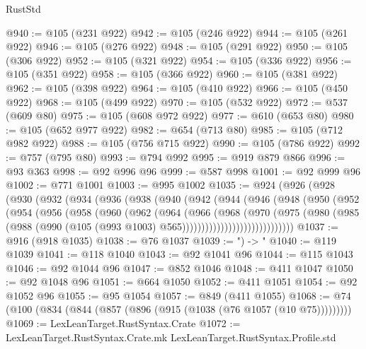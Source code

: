 \begin{lexlean}{RustStd}
\begin{coremodule}
@940 := @105 (@231 @922)
@942 := @105 (@246 @922)
@944 := @105 (@261 @922)
@946 := @105 (@276 @922)
@948 := @105 (@291 @922)
@950 := @105 (@306 @922)
@952 := @105 (@321 @922)
@954 := @105 (@336 @922)
@956 := @105 (@351 @922)
@958 := @105 (@366 @922)
@960 := @105 (@381 @922)
@962 := @105 (@398 @922)
@964 := @105 (@410 @922)
@966 := @105 (@450 @922)
@968 := @105 (@499 @922)
@970 := @105 (@532 @922)
@972 := @537 (@609 @80)
@975 := @105 (@608 @972 @922)
@977 := @610 (@653 @80)
@980 := @105 (@652 @977 @922)
@982 := @654 (@713 @80)
@985 := @105 (@712 @982 @922)
@988 := @105 (@756 @715 @922)
@990 := @105 (@786 @922)
@992 := @757 (@795 @80)
@993 := @794 @992
@995 := @919 @879 @866
@996 := @93 @363
@998 := @92 @996 @96
@999 := @587 @998
@1001 := @92 @999 @96
@1002 := @771 @1001
@1003 := @995 @1002
@1035 := @924
    (@926
      (@928
        (@930
          (@932
            (@934
              (@936
                (@938
                  (@940
                    (@942
                      (@944
                        (@946
                          (@948
                            (@950
                              (@952
                                (@954
                                  (@956
                                    (@958
                                      (@960
                                        (@962
                                          (@964
                                            (@966
                                              (@968
                                                (@970
                                                  (@975
                                                    (@980
                                                      (@985
                                                        (@988
                                                          (@990
                                                            (@105
                                                              (@993 @1003)
                                                              @565)))))))))))))))))))))))))))))
@1037 := @916 (@918 @1035)
@1038 := @76 @1037
@1039 := ") -> "
@1040 := @119 @1039
@1041 := @118 @1040
@1043 := @92 @1041 @96
@1044 := @115 @1043
@1046 := @92 @1044 @96
@1047 := @852 @1046
@1048 := @411 @1047
@1050 := @92 @1048 @96
@1051 := @664 @1050
@1052 := @411 @1051
@1054 := @92 @1052 @96
@1055 := @95 @1054
@1057 := @849 (@411 @1055)
@1068 := @74 (@100 (@834 (@844 (@857 (@896 (@915 (@1038 (@76 @1057 (@10 @75)))))))))
@1069 := LexLeanTarget.RustSyntax.Crate
@1072 := LexLeanTarget.RustSyntax.Crate.mk LexLeanTarget.RustSyntax.Profile.std

\end{coremodule}
\end{lexlean}
